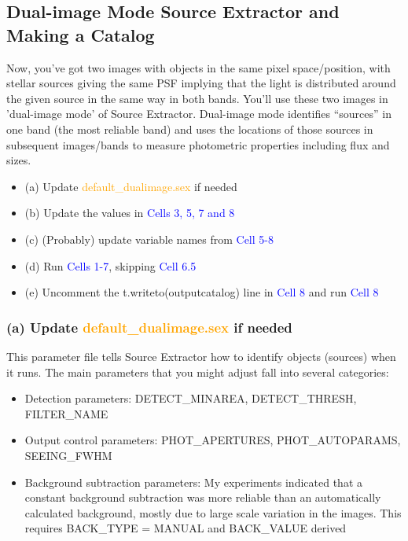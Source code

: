 \documentclass[a4paper,10pt]{article}
\begin{document}
\subsection{Dual-image Mode Source Extractor and Making a Catalog}

Now, you've got two images with objects in the same pixel space/position, with stellar sources giving the same PSF implying that the light is distributed around the given source in the same way in both bands. You'll use these two images in 'dual-image mode' of Source Extractor. Dual-image mode identifies ``sources'' in one band (the most reliable band) and uses the locations of those sources in subsequent images/bands to measure photometric properties including flux and sizes. 

\begin{itemize}
\setlength{\itemsep}{-5pt}
 \item (a) Update \textcolor{orange}{default\_dualimage.sex} if needed
 \item (b) Update the values in \textcolor{blue}{Cells 3, 5, 7 and 8}
 \item (c) (Probably) update variable names from \textcolor{blue}{Cell 5-8}
 \item (d) Run \textcolor{blue}{Cells 1-7}, skipping \textcolor{blue}{Cell 6.5}
 \item (e) Uncomment the t.writeto(outputcatalog) line in \textcolor{blue}{Cell 8} and run \textcolor{blue}{Cell 8} 
\end{itemize}

\subsubsection{(a)  Update \textcolor{orange}{default\_dualimage.sex} if needed}

This parameter file tells Source Extractor how to identify objects (sources) when it runs. The main parameters that you might adjust fall into several categories:

\begin{itemize}
\setlength{\itemsep}{-5pt}
 \item Detection parameters: DETECT\_MINAREA, DETECT\_THRESH, FILTER\_NAME 
 \item Output control parameters: PHOT\_APERTURES, PHOT\_AUTOPARAMS, SEEING\_FWHM
 \item Background subtraction parameters: My experiments indicated that a constant background subtraction was more reliable than an automatically calculated background, mostly due to large scale variation in the images. This requires BACK\_TYPE = MANUAL and BACK\_VALUE derived
\end{itemize}
\end{document}
